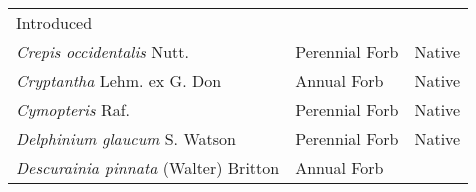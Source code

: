\documentclass[8pt,]{article}
\begin{document}
\begin{longtable}[]{@{}lll@{}}
\begin{minipage}[t]{0.15\columnwidth}
Introduced\strut
\end{minipage}\tabularnewline
\begin{minipage}[t]{0.49\columnwidth}\raggedright\strut
\emph{Crepis occidentalis} Nutt.\strut
\end{minipage} & \begin{minipage}[t]{0.27\columnwidth}\raggedright\strut
Perennial Forb\strut
\end{minipage} & \begin{minipage}[t]{0.15\columnwidth}\raggedright\strut
Native\strut
\end{minipage}\tabularnewline
\begin{minipage}[t]{0.49\columnwidth}\raggedright\strut
\emph{Cryptantha} Lehm. ex G. Don\strut
\end{minipage} & \begin{minipage}[t]{0.27\columnwidth}\raggedright\strut
Annual Forb\strut
\end{minipage} & \begin{minipage}[t]{0.15\columnwidth}\raggedright\strut
Native\strut
\end{minipage}\tabularnewline
\begin{minipage}[t]{0.49\columnwidth}\raggedright\strut
\emph{Cymopteris} Raf.\strut
\end{minipage} & \begin{minipage}[t]{0.27\columnwidth}\raggedright\strut
Perennial Forb\strut
\end{minipage} & \begin{minipage}[t]{0.15\columnwidth}\raggedright\strut
Native\strut
\end{minipage}\tabularnewline
\begin{minipage}[t]{0.49\columnwidth}\raggedright\strut
\emph{Delphinium glaucum} S. Watson\strut
\end{minipage} & \begin{minipage}[t]{0.27\columnwidth}\raggedright\strut
Perennial Forb\strut
\end{minipage} & \begin{minipage}[t]{0.15\columnwidth}\raggedright\strut
Native\strut
\end{minipage}\tabularnewline
\begin{minipage}[t]{0.49\columnwidth}\raggedright\strut
\emph{Descurainia pinnata} (Walter) Britton\strut
\end{minipage} & \begin{minipage}[t]{0.27\columnwidth}\raggedright\strut
Annual Forb\strut
\end{minipage} & \begin{minipage}[t]{0.15\columnwidth}\raggedright\strut

\end{minipage}
\end{longtable}
\end{document}
